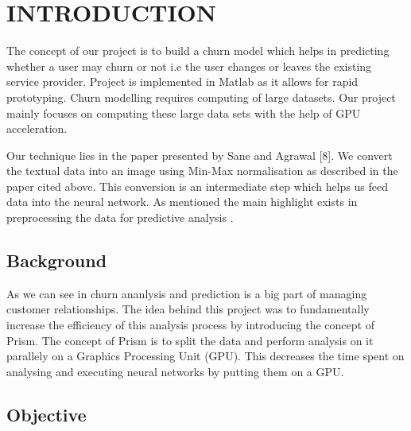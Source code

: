 

\chapter{INTRODUCTION}

\hspace{0.9cm} The concept of our project is to build a churn model which helps in predicting whether a user may churn or not i.e the user changes or leaves the existing service provider. Project is implemented in Matlab as it allows for rapid prototyping. Churn modelling requires computing of large datasets. Our project mainly focuses on computing these large data sets with the help of GPU acceleration.

Our technique lies in the paper presented by Sane and Agrawal [8]. We convert the textual data into an image using Min-Max normalisation as described in the paper cited above. This conversion is an intermediate step which helps us feed data into the neural network. As mentioned the main highlight exists in preprocessing the data for predictive analysis \cite{citation-1}.




\section{Background}

\hspace{0.9cm} As we can see in \cite{citation-1} churn ananlysis and prediction is a big part of managing customer relationships. The idea behind this project was to fundamentally increase the efficiency of this analysis process by introducing the concept of Prism. The concept of Prism is to split the data and perform analysis on it parallely on a Graphics Processing Unit (GPU). This decreases the time spent on analysing and executing neural networks by putting them on a GPU.

\section{Objective}

